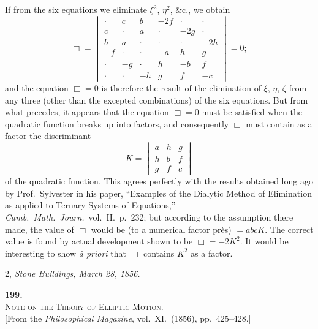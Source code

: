 \documentclass[11pt]{article}
\begin{document}
If from the six equations we eliminate $\xi^{2}$, $\eta^{2}$, \&c., we obtain
\[
\Box =
\begin{vmatrix}
\cdot & c & b & -2f & \cdot & \cdot\\
c & \cdot & a & \cdot & -2g & \cdot\\
b & a & \cdot & \cdot & \cdot & -2h\\
-f & \cdot & \cdot & -a & h & g\\
\cdot & -g & \cdot & h & -b & f\\
\cdot & \cdot & -h & g & f & -c
\end{vmatrix}
= 0;
\]
and the equation $\Box=0$ is therefore the result of the elimination of $\xi$, $\eta$, $\zeta$ from any three (other than the excepted combinations) of the six equations. But from what precedes, it appears that the equation $\Box=0$ must be satisfied when the quadratic function breaks up into factors, and consequently $\Box$ must contain as a factor the discriminant
\[
K=\begin{vmatrix}
a & h & g\\
h & b & f\\
g & f & c
\end{vmatrix}
\]
of the quadratic function. This agrees perfectly with the results obtained long ago by Prof.\ Sylvester in his paper, ``Examples of the Dialytic Method of Elimination as applied to Ternary Systems of Equations,'' \emph{Camb.\ Math.\ Journ.}\ vol.\ II.\ p.\ 232; but according to the assumption there made, the value of $\Box$ would be (to a numerical factor pr\`es) $= abcK$. The correct value is found by actual development shown to be $\Box=-2K^{2}$. It would be interesting to show \emph{\`a priori} that $\Box$ contains $K^{2}$ as a factor.

\medskip
\hfill 2, \emph{Stone Buildings, March 28, 1856.}

\clearpage


\begin{center}
\textbf{\large 199.}\\[6pt]
\textsc{Note on the Theory of Elliptic Motion.}\\[4pt]
\small [From the \emph{Philosophical Magazine}, vol.\ XI.\ (1856), pp.\ 425--428.]
\end{center}

\medskip
\end{document}
